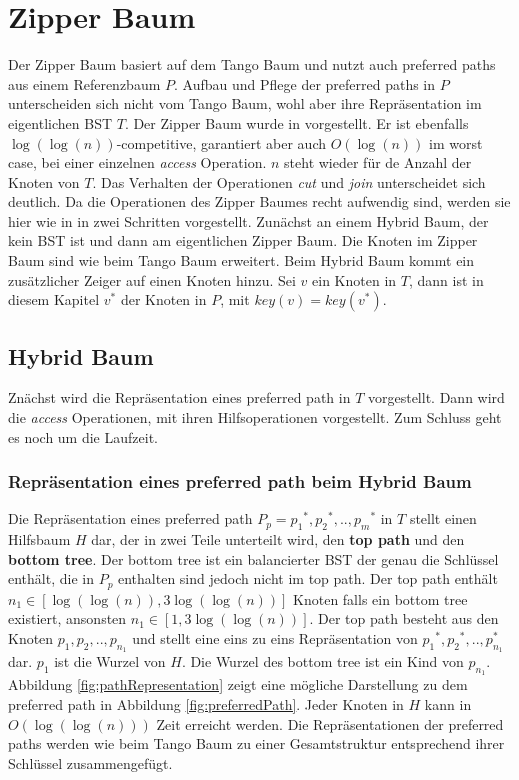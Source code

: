 \documentclass[a4paper,12pt]{article}
\begin{document}
\section {Zipper Baum}
Der Zipper Baum basiert auf dem Tango Baum und nutzt auch preferred paths aus einem Referenzbaum $P$. Aufbau und Pflege der preferred paths in $P$ unterscheiden sich nicht vom Tango Baum, wohl aber ihre Repräsentation im eigentlichen BST $T$. Der Zipper Baum wurde in \cite{zipper} vorgestellt. Er ist ebenfalls $\log\left(\log\left(n\right)\right)$-competitive,  garantiert aber auch  $O\left(\log \left(n\right)\right)$ im worst case, bei einer einzelnen \textit{access} Operation. $n$ steht wieder für de Anzahl der Knoten von $T$. Das Verhalten der Operationen \textit{cut} und \textit{join} unterscheidet sich deutlich. Da die Operationen des Zipper Baumes recht aufwendig sind, werden sie hier wie in \cite{zipper} in zwei Schritten vorgestellt. Zunächst an einem Hybrid Baum, der kein  BST ist und dann am eigentlichen Zipper Baum. Die Knoten im Zipper Baum sind wie beim Tango Baum erweitert. Beim Hybrid Baum kommt ein zusätzlicher Zeiger auf einen Knoten hinzu.  Sei $v$ ein Knoten in $T$, dann ist in diesem Kapitel $v^*$ der Knoten in $P$, mit $\mathit{key}\left(v\right) = \mathit{key}\left(v^*\right)$.

\subsection{Hybrid Baum}
Znächst wird die Repräsentation eines preferred path in $T$ vorgestellt. Dann wird die \textit{access} Operationen, mit ihren Hilfsoperationen vorgestellt. Zum Schluss geht es noch um die Laufzeit. 


\subsubsection{Repräsentation eines preferred path beim Hybrid Baum} 
Die Repräsentation eines preferred path  $P_p = {p_1}^*,{p_2}^*,..,{p_m}^*$ in $T$ stellt einen Hilfsbaum $H$ dar, der in zwei Teile unterteilt wird, den  \textbf{top path} und den \textbf{bottom tree}. Der bottom tree ist ein balancierter BST der genau die Schlüssel enthält, die in $P_p$ enthalten sind jedoch nicht im top path.  Der top path enthält $n_1 \in \left[\log\left(\log\left(n\right)\right), 3 \log\left(\log\left(n\right)\right) \right]$ Knoten falls ein bottom tree existiert, ansonsten  $n_1 \in \left[1, 3 \log\left(\log\left(n\right)\right) \right]$. Der top path besteht aus den Knoten ${p_1},{p_2},..,{p_{n_1}}$ und stellt eine eins zu eins Repräsentation von $ {p_1}^*,{p_2}^*,..,p_{n_1}^*$ dar. ${p_1}$ ist die Wurzel von $H$. Die Wurzel des bottom tree ist ein Kind von ${p_{n_1}}$. Abbildung \ref{fig:pathRepresentation} zeigt eine mögliche Darstellung zu dem preferred path in Abbildung \ref{fig:preferredPath}. Jeder Knoten in $H$ kann in $O\left(\log\left(\log \left(n\right)\right)\right)$ Zeit erreicht werden. Die Repräsentationen der preferred paths werden wie beim Tango Baum zu einer Gesamtstruktur entsprechend ihrer Schlüssel zusammengefügt. 
\end{document}
